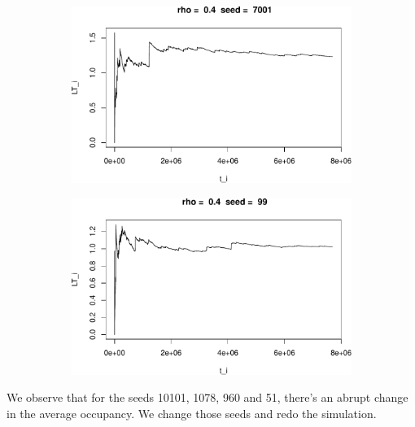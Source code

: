 \documentclass[]{article}
\begin{document}
\begin{figure}[h!]
\begin{subfigure}[b]{.55\linewidth}
\includegraphics[width=\linewidth]{003_files/figure-latex/unnamed-chunk-13-9.pdf}
\end{subfigure}\hfill
\begin{subfigure}[b]{.55\linewidth}
\includegraphics[width=\linewidth]{003_files/figure-latex/unnamed-chunk-13-10.pdf}
\end{subfigure}\vfill
\end{figure}




We observe that for the seeds 10101, 1078, 960 and 51, there's an abrupt
change in the average occupancy. We change those seeds and redo the
simulation.

\end{document}
